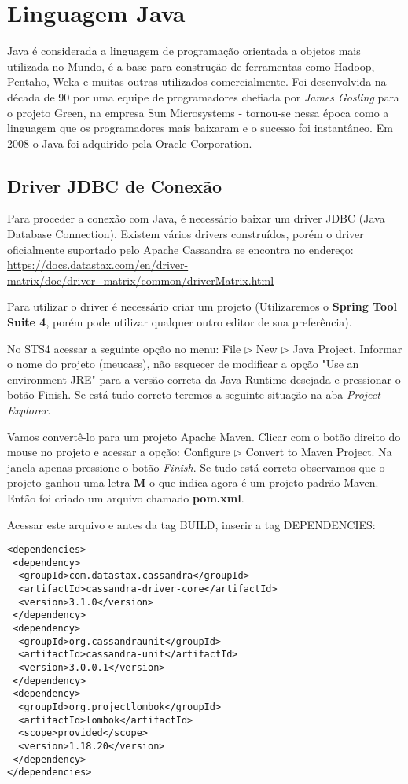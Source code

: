 \section{Linguagem Java}
Java é considerada a linguagem de programação orientada a objetos mais utilizada no Mundo, é a base para construção de ferramentas como Hadoop, Pentaho, Weka e muitas outras utilizados comercialmente. Foi desenvolvida na década de 90 por uma equipe de programadores chefiada por \textit{James Gosling} para o projeto Green, na empresa Sun Microsystems - tornou-se nessa época como a linguagem que os programadores mais baixaram e o sucesso foi instantâneo. Em 2008 o Java foi adquirido pela Oracle Corporation.

\subsection{Driver JDBC de Conexão}
Para proceder a conexão com Java, é necessário baixar um driver JDBC (Java Database Connection). Existem vários drivers construídos, porém o driver oficialmente suportado pelo Apache Cassandra se encontra no endereço: \url{https://docs.datastax.com/en/driver-matrix/doc/driver_matrix/common/driverMatrix.html}

Para utilizar o driver é necessário criar um projeto (Utilizaremos o \textbf{Spring Tool Suite 4}, porém pode utilizar qualquer outro editor de sua preferência).

No STS4 acessar a seguinte opção no menu: File $\triangleright$ New $\triangleright$ Java Project. Informar o nome do projeto (meucass), não esquecer de modificar a opção "Use an environment JRE" para a versão correta da Java Runtime desejada e pressionar o botão Finish. Se está tudo correto teremos a seguinte situação na aba \textit{Project Explorer}.

Vamos convertê-lo para um projeto Apache Maven. Clicar com o botão direito do mouse no projeto e acessar a opção: Configure $\triangleright$ Convert to Maven Project. Na janela apenas pressione o botão \textit{Finish}. Se tudo está correto observamos que o projeto ganhou uma letra \textbf{M} o que indica agora é um projeto padrão Maven. Então foi criado um arquivo chamado \textbf{pom.xml}. 

Acessar este arquivo e antes da tag BUILD, inserir a tag DEPENDENCIES:
\begin{lstlisting}[]
<dependencies>
 <dependency>
  <groupId>com.datastax.cassandra</groupId>
  <artifactId>cassandra-driver-core</artifactId>
  <version>3.1.0</version>
 </dependency>
 <dependency>
  <groupId>org.cassandraunit</groupId>
  <artifactId>cassandra-unit</artifactId>
  <version>3.0.0.1</version>
 </dependency>
 <dependency>
  <groupId>org.projectlombok</groupId>
  <artifactId>lombok</artifactId>
  <scope>provided</scope>
  <version>1.18.20</version>
 </dependency>
</dependencies>
\end{lstlisting}

